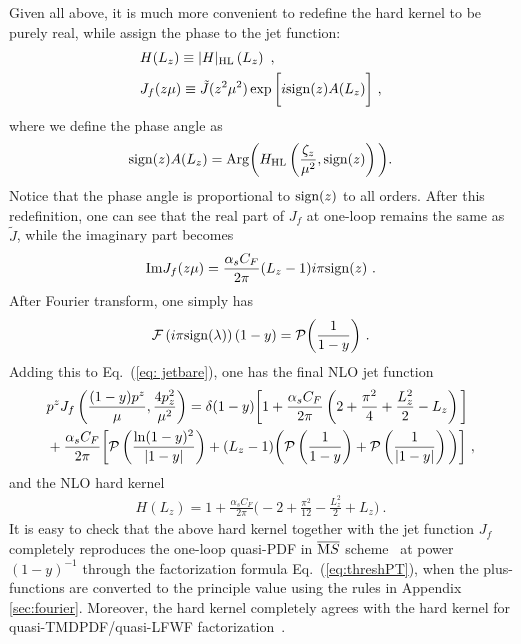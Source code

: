 \documentclass[a4paper,11pt]{article}
\begin{document}
Given all above, it is much more convenient to redefine the hard kernel to be purely real, while assign the phase to the jet function:
\begin{align}\label{eq:hardabs}
 &H(L_z) \equiv |H|_{\rm HL}\left(L_z \right)\ , \\
 & J_f(z\mu)\equiv\tilde J(z^2\mu^2) \exp \bigg[i {\rm sign}(z) A(L_z) \bigg] \ , \label{eq:defJf}
\end{align}
where we define the phase angle as
\begin{align}\label{eq:phaseangle}
{\rm sign}(z) A(L_z)={\rm Arg}\bigg(H_{\rm HL}\left(\frac{\zeta_z}{\mu^2},{\rm sign}(z)\right)\bigg).
\end{align}
Notice that the phase angle is proportional to ${\rm sign}(z)$ to all orders. 
After this redefinition, one can see that the real part of $J_f$ at one-loop remains the same as $\tilde J$, while the imaginary part becomes
\begin{align}\label{eq:JetoneloopIM}
{\rm Im} J_f(z\mu)=\frac{\alpha_sC_F}{2\pi}(L_z-1)i\pi {\rm sign}(z) \ .
\end{align}
After Fourier transform, one simply has
\begin{align}
{\cal F}\left(i\pi{\rm sign}(\lambda)\right)(1-y)={\cal P} \bigg(\frac{1}{1-y}\bigg) \ .
\end{align}
Adding this to Eq.~(\ref{eq: jetbare}), one has the final NLO jet function 
\begin{align} \label{eq:jetonloop}
&p^zJ_{f}\left(\frac{(1-y)p^z}{\mu},\frac{4p_z^2}{\mu^2}\right)=\delta(1-y)\bigg[1+\frac{\alpha_sC_F}{2\pi}\left(2+\frac{\pi^2}{4}+\frac{L_z^2}{2}-L_z\right)\bigg]\nonumber \\ 
&+\frac{\alpha_sC_F}{2\pi}\bigg[{\cal P}\left(\frac{\ln (1-y)^2}{|1-y|}\right)+(L_z-1)\bigg({\cal P}\left(\frac{1}{1-y} \right) +{\cal P}\left(\frac{1}{|1-y|} \right)\bigg)\bigg] \ ,
\end{align}
and the NLO hard kernel
\begin{align}\label{hardoneloop}
H(L_z)=1+\frac{\alpha_s C_F}{2\pi}\bigg(-2+\frac{\pi^2}{12}-\frac{L_z^2}{2}+L_z\bigg) \ .
\end{align}
It is easy to check that the above hard kernel together with the jet function $J_f$ completely reproduces the one-loop quasi-PDF in $\overline{\text MS}$ scheme~\cite{Xiong:2013bka,Izubuchi:2018srq} at power $(1-y)^{-1}$ through the factorization formula Eq.~(\ref{eq:threshPT}), when the plus-functions are converted to the principle value using the rules in Appendix \ref{sec:fourier}. Moreover, the hard kernel completely agrees with the hard kernel for quasi-TMDPDF/quasi-LFWF factorization~\cite{Ebert:2019okf,Ji:2019ewn,Vladimirov:2020ofp,Ebert:2020gxr,Ji:2021znw}.
\end{document}
